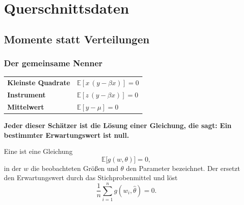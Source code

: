 \part{Querschnittsdaten}

\chapter{Momente statt Verteilungen}

\section{Der gemeinsame Nenner}

\begin{merksatz}
\begin{center}
{\small
\renewcommand{\arraystretch}{1.55}
\begin{tabular}{@{}P{2.8cm}P{5.8cm}@{}}
\toprule
\textbf{Kleinste Quadrate} & $\mathbb{E}[x\,(y-\beta x)] = 0$\\
\textbf{Instrument} & $\mathbb{E}[z\,(y-\beta x)] = 0$\\
\textbf{Mittelwert} & $\mathbb{E}[y - \mu] = 0$\\
\bottomrule
\end{tabular}}
\end{center}

\begin{center}
\begin{minipage}{0.9\textwidth}
\textbf{Jeder dieser Schätzer ist die Lösung einer Gleichung, die sagt: Ein bestimmter Erwartungswert ist null.}
\end{minipage}
\end{center}

\begin{center}
\begin{minipage}{0.88\textwidth}
\end{minipage}
\end{center}
\end{merksatz}

\begin{definition}
Eine  ist eine Gleichung
\[ \mathbb{E}\bigl[g(w,\theta)\bigr] = 0 , \]
in der $w$ die beobachteten Größen und $\theta$ den Parameter bezeichnet. Der  ersetzt den Erwartungswert durch das Stichprobenmittel und löst
\[ \frac1n\sum_{i=1}^{n} g(w_i,\hat\theta) = 0 . \]
\end{definition}

